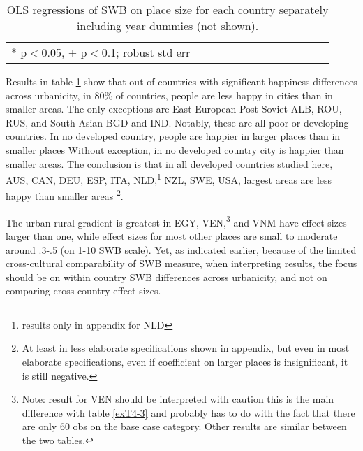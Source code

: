 \documentclass[10pt, letterpaper]{article}
\begin{document}
\begin{spacing}{.9} \begin{table}[H]\centering   \begin{scriptsize} \begin{tabular}{p{.5in}p{.5in}p{.5in}p{.5in}p{.5in}p{.5in}p{.5in}p{.5in}p{.5in}p{.5in}p{.5 in}p{.5in}p{.5 in}}\hline  \hline * p$<$0.05, $+$ p$<$0.1; robust std err \end{tabular}\end{scriptsize}\caption{\label{d1}OLS regressions of SWB on place size for each country separately including year
dummies (not shown).}\end{table} \end{spacing}


Results in table \ref{d1} %
show that out of countries with significant happiness differences across
urbanicity, in 80\% of countries, people are less happy in cities than in
smaller areas. The only exceptions are East European Post Soviet ALB, ROU, RUS,
and South-Asian BGD and IND. Notably, these are all poor or developing
countries. In no developed country, people are happier in larger places than in
smaller places
%
Without exception, in no developed country city is happier than smaller areas.
%
%
The conclusion is that in all developed countries studied here, AUS, CAN, DEU, ESP, ITA,
NLD,\footnote{results only in appendix for NLD} NZL, SWE, USA,  largest areas
are less happy than smaller areas \footnote{At least in less elaborate specifications shown in appendix, but even in most elaborate specifications, even if coefficient on larger places is insignificant, it is still negative.}.

The urban-rural gradient is greatest in EGY, VEN,\footnote{Note: result for VEN should be interpreted with caution this is the
  main difference with table \ref{exT4-3} and probably has to do with the fact
  that there are only 60 obs on the base case category. Other results are
  similar between the two tables.}
 and VNM have effect sizes larger than one, while effect sizes for most other
 places are small to moderate around .3-.5 (on 1-10 SWB scale).   
 Yet, as indicated earlier, because of the
limited cross-cultural comparability of SWB measure, when interpreting results,
the focus should be on within country SWB differences across urbanicity, and not
on comparing cross-country effect sizes.
\end{document}
